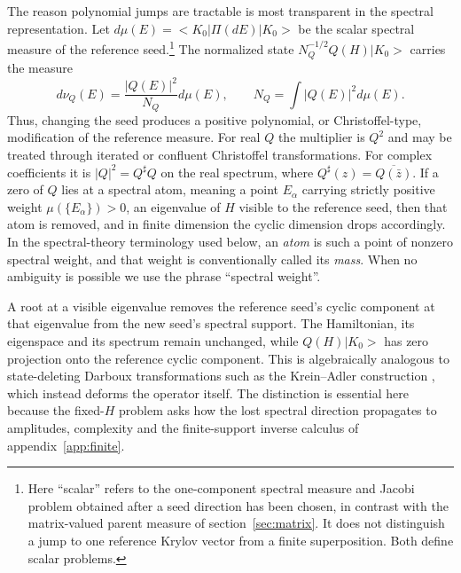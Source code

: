 \documentclass[a4paper,11pt]{article}
\def\ket#1{|#1>}%
\def\bra#1{<#1|}%
\def\dd{d}%
\theoremstyle{definition}
\theoremstyle{remark}
\newcommand{\ket}[1]{|#1\rangle}
\newcommand{\bra}[1]{\langle #1|}
\newcommand{\dd}{\mathrm d}
\newcommand{\Qsh}{Q^{\sharp}}
\begin{document}
The reason polynomial jumps are tractable is most transparent in the spectral representation. Let
$\dd\mu(E)=\bra{K_0}\Pi(\dd E)\ket{K_0}$ be the scalar spectral measure of the reference seed.\footnote{Here ``scalar'' refers to the one-component spectral measure and Jacobi problem obtained after a seed direction has been chosen, in contrast with the matrix-valued parent measure of section~\ref{sec:matrix}. It does not distinguish a jump to one reference Krylov vector from a finite superposition. Both define scalar problems.}
The normalized state $N_Q^{-1/2}Q(H)\ket{K_0}$ carries the measure
\begin{equation}
   \dd\nu_Q(E)=\frac{|Q(E)|^2}{N_Q}\dd\mu(E),
   \qquad
   N_Q=\int |Q(E)|^2\dd\mu(E).
   \label{eq:intro-measure}
\end{equation}
Thus, changing the seed produces a positive polynomial, or Christoffel-type, modification of the reference measure. For real $Q$ the multiplier is $Q^2$ and may be treated through iterated or confluent Christoffel transformations. For complex coefficients it is
$|Q|^2=\Qsh Q$ on the real spectrum, where
$\Qsh(z)=\overline{Q(\bar z)}$. If a zero of $Q$ lies at a spectral atom, meaning a point $E_\alpha$ carrying strictly positive
weight $\mu(\{E_\alpha\})>0$, an eigenvalue of $H$ visible to the reference seed,
then that atom is removed, and in finite dimension the cyclic dimension drops accordingly.
In the spectral-theory terminology used below, an \emph{atom} is such a point of nonzero
spectral weight, and that weight is conventionally called its \emph{mass}.  When no ambiguity is
possible we use the phrase ``spectral weight''.

A root at a visible eigenvalue
removes the reference seed's cyclic component at that eigenvalue from the new seed's spectral
support.  The Hamiltonian, its eigenspace and its spectrum remain unchanged, while
$Q(H)\ket{K_0}$ has zero projection onto the reference cyclic component.  This is algebraically analogous to
state-deleting Darboux transformations such as the Krein--Adler construction
\cite{OdakeSasaki2013KreinAdler}, which instead deforms the operator itself.  The distinction is
essential here because the fixed-$H$ problem asks how the lost spectral direction propagates to
amplitudes, complexity and the finite-support inverse calculus of appendix~\ref{app:finite}.
\end{document}
